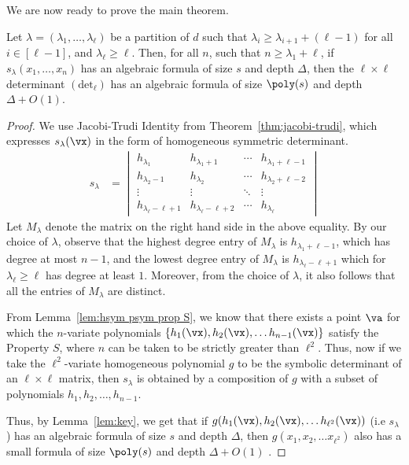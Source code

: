 %
%
%


%
%
%
%

We are now ready to prove the main theorem. 

\begin{theorem}
\label{thm:main-intro proof}
Let $\lambda= (\lambda_1,\ldots,\lambda_\ell)$ be a partition of $d$ such that  $\lambda_i \geq  \lambda_{i+1}+(\ell-1)$ for all $i \in [\ell-1]$, and $\lambda_{\ell} \geq \ell$. Then, for all $n$, such that $n \geq \lambda_1 + \ell$, if $s_\lambda(x_1,\ldots,x_n)$ has an algebraic formula of size $s$ and depth $\Delta$, then the $\ell\times \ell$ determinant $(\mathrm{det}_\ell )$ has an algebraic formula of size $\poly(s)$ and depth $\Delta + O(1).$  
\end{theorem}

\begin{proof}
	We use Jacobi-Trudi Identity from Theorem~\ref{thm:jacobi-trudi}, which expresses $s_\lambda(\vx)$ in the form of homogeneous symmetric determinant. 
\begin{align*}
s_\lambda &=  \begin{vmatrix}h_{\lambda_1}&h_{\lambda_1+1}&\cdots&h_{\lambda_1+\ell-1}\\h_{\lambda_2-1}&h_{\lambda_2}&\cdots&h_{\lambda_2+\ell-2}\\\vdots&\vdots&\ddots&\vdots\\h_{\lambda_\ell-\ell+1}&h_{\lambda_\ell-\ell+2}&\cdots&h_{\lambda_\ell}\end{vmatrix}
\end{align*}	
Let $M_{\lambda}$ denote the matrix on the right hand side in the above equality. By our choice of $\lambda$, observe that the highest degree entry of $M_{\lambda}$ is $h_{\lambda_1 + \ell -1}$, which has degree at most $n-1$, and the lowest degree entry of $M_{\lambda}$ is $h_{\lambda_{\ell}-\ell + 1}$ which for $\lambda_{\ell} \geq \ell$ has degree at least $1$. Moreover, from the choice of $\lambda$, it also follows that all the entries of $M_{\lambda}$ are distinct.
%
%

From Lemma~\ref{lem:hsym psym prop S}, we know that there exists a point $\va$ for which the $n$-variate polynomials $\{h_1({\vx}),h_2(\vx), \ldots h_{n-1}(\vx)\} $ satisfy the Property $S$, where $n$ can be taken to be strictly greater than $\ell^2$. Thus, now if we take the $\ell^2$-variate homogeneous polynomial $g$ to be the symbolic determinant of an $\ell \times \ell$ matrix, then $s_{\lambda}$ is obtained by a composition of $g$ with a subset of polynomials $h_1, h_2, \ldots, h_{n-1}$. 
%
%
 
Thus, by Lemma~\ref{lem:key}, we get that if $g(h_1({\vx}),h_2(\vx), \ldots h_{\ell^2}(\vx))$ (i.e $s_\lambda$) has an algebraic formula of size $s$ and depth $\Delta$, then $g(x_1,x_2, \ldots x_{\ell^2})$ also has a small formula of size $\poly(s)$ and depth $\Delta+O(1)$ . 
%
\end{proof} 
%
%


